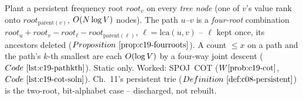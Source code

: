 \begin{recallbox}
Plant a persistent frequency root \(\mathit{root}_v\) on every \emph{tree node} (one  of \(v\)'s value rank onto \(\mathit{root}_{\mathrm{parent}(v)}\), \(O(N\log V)\) nodes). The path \(u\text{--}v\) is a \emph{four-root} combination \(\mathit{root}_u+\mathit{root}_v-\mathit{root}_\ell-\mathit{root}_{\mathrm{parent}(\ell)}\), \(\ell=\mathrm{lca}(u,v)\) -- \(\ell\) kept once, its ancestors deleted (\(\propref{c19-fourroots}\)). A count \(\le x\) on a path and the path's \(k\)-th smallest are each \(O(\log V)\) by a four-way joint descent (\(\coderef{c19-pathkth}\)). Static only. Worked: SPOJ~COT (\(\probref{c19-cot}\), \(\coderef{c19-cot-soln}\)). Ch.~11's persistent trie (\(\defref{c08-persistent}\)) is the two-root, bit-alphabet case -- discharged, not rebuilt.
\end{recallbox}
